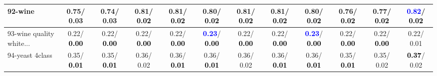 \begin{table}[h]
\begin{center}
{\begin{tabular}{lc|c|c|c|c|c|c|c|c|c|c}
92-wine &   0.75/  0.03 &   0.74/  0.03 &   0.81/\textcolor{black}{\textbf{  0.02}} &   0.81/\textcolor{black}{\textbf{  0.02}} &   0.80/\textcolor{black}{\textbf{  0.02}} &   0.81/\textcolor{black}{\textbf{  0.02}} &   0.81/\textcolor{black}{\textbf{  0.02}} &   0.80/\textcolor{black}{\textbf{  0.02}} &   0.76/\textcolor{black}{\textbf{  0.02}} &   0.77/\textcolor{black}{\textbf{  0.02}} & \textcolor{blue}{\textbf{  0.82}}/\textcolor{black}{\textbf{  0.02}} \\ \hline
93-wine quality white... &   0.22/\textcolor{black}{\textbf{  0.00}} &   0.22/\textcolor{black}{\textbf{  0.00}} &   0.22/\textcolor{black}{\textbf{  0.00}} &   0.22/\textcolor{black}{\textbf{  0.00}} & \textcolor{blue}{\textbf{  0.23}}/\textcolor{black}{\textbf{  0.00}} &   0.22/\textcolor{black}{\textbf{  0.00}} &   0.22/\textcolor{black}{\textbf{  0.00}} & \textcolor{blue}{\textbf{  0.23}}/\textcolor{black}{\textbf{  0.00}} &   0.22/\textcolor{black}{\textbf{  0.00}} &   0.22/\textcolor{black}{\textbf{  0.00}} &   0.22/  0.01 \\
94-yeast 4class &   0.35/\textcolor{black}{\textbf{  0.01}} &   0.35/\textcolor{black}{\textbf{  0.01}} &   0.36/  0.02 &   0.36/\textcolor{black}{\textbf{  0.01}} &   0.36/\textcolor{black}{\textbf{  0.01}} &   0.36/  0.02 &   0.36/\textcolor{black}{\textbf{  0.01}} &   0.36/\textcolor{black}{\textbf{  0.01}} &   0.35/\textcolor{black}{\textbf{  0.01}} &   0.35/  0.02 & \textcolor{black}{\textbf{  0.37}}/  0.02 \\\end{tabular}
}\label{strats2aCIELM}
\end{center}
\end{table}
